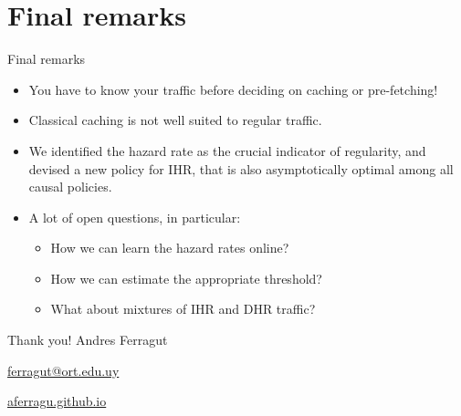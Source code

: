 \documentclass[aspectratio=169]{beamer}
\newenvironment*{myitem}[1][1.5em]{\begin{itemize}\setlength{\itemsep}{#1}}{\end{itemize}}
\begin{document}
\section{Final remarks}

\begin{frame}{Final remarks}
	
	\begin{myitem}[2em]
		\item<1-> You have to \alert{know your traffic} before deciding on caching or pre-fetching!
		
		\item<2-> Classical caching is \alert{not well suited} to regular traffic.
		
		\item<3-> We identified the \alert{hazard rate} as the crucial indicator of regularity, and devised a new policy for IHR, that is also \alert{asymptotically optimal} among all causal policies.
		
		\item<4-> A lot of open questions, in particular:
		
		\pause

		\begin{itemize}
			\item How we can learn the hazard rates online?
			\item How we can estimate the appropriate threshold?
			\item What about mixtures of IHR and DHR traffic?
		\end{itemize}

		\pause


	\end{myitem}
\end{frame}


\begin{frame}[plain]
	\vfill
	{\Huge \alert{Thank you!}}
	\vfill
	Andres Ferragut

	\smallskip

	\href{mailto://ferragut@ort.edu.uy}{\alert{ferragut@ort.edu.uy}}
	
	\smallskip

	\href{http://aferragu.github.io}{\alert{aferragu.github.io}}
\end{frame}
\end{document}
